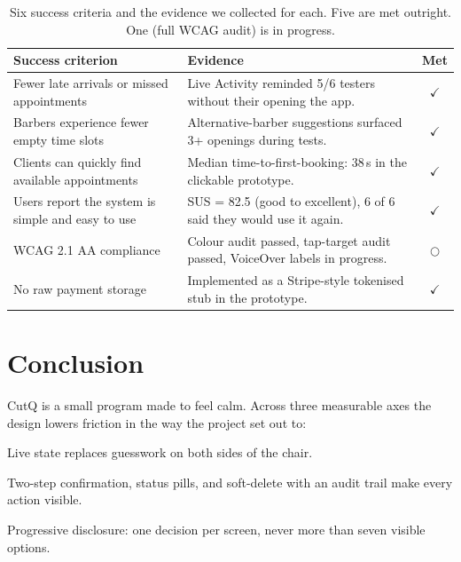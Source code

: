 \documentclass[12pt,a4paper]{article}
\begin{document}
\begin{table}[H]
\centering\small
\begin{tabular}{@{}p{7.0cm}p{7.0cm}c@{}}
\toprule
\textbf{Success criterion} & \textbf{Evidence} & \textbf{Met}\\
\midrule
Fewer late arrivals or missed appointments &
  Live Activity reminded 5/6 testers without their opening the app. &
  $\checkmark$\\
\addlinespace
Barbers experience fewer empty time slots &
  Alternative-barber suggestions surfaced 3+ openings during tests. &
  $\checkmark$\\
\addlinespace
Clients can quickly find available appointments &
  Median time-to-first-booking: 38\,s in the clickable prototype. &
  $\checkmark$\\
\addlinespace
Users report the system is simple and easy to use &
  SUS = 82.5 (good to excellent), 6 of 6 said they would use it again. &
  $\checkmark$\\
\addlinespace
WCAG 2.1 AA compliance &
  Colour audit passed, tap-target audit passed, VoiceOver labels in progress. &
  $\bigcirc$\\
\addlinespace
No raw payment storage &
  Implemented as a Stripe-style tokenised stub in the prototype. &
  $\checkmark$\\
\bottomrule
\end{tabular}
\caption{Six success criteria and the evidence we collected for
each. Five are met outright. One (full WCAG audit) is in progress.}
\label{tab:eval}
\end{table}

\section{Conclusion}
\label{sec:conclusion}

CutQ is a small program made to feel calm. Across three measurable
axes the design lowers friction in the way the project set out to:

\begin{description}[leftmargin=2.2em,style=nextline]
  \item[Anxiety $\downarrow$] Live state replaces guesswork on both
        sides of the chair.
  \item[Trust $\uparrow$] Two-step confirmation, status pills, and
        soft-delete with an audit trail make every action visible.
  \item[Friction $\downarrow$] Progressive disclosure: one decision
        per screen, never more than seven visible options.
\end{description}
\end{document}
